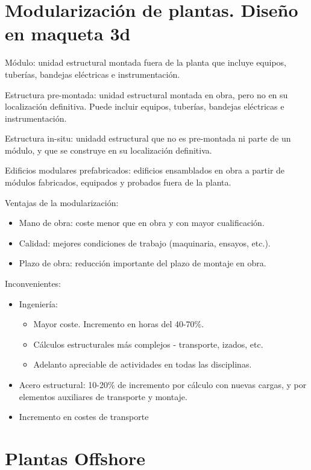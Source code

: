 \section{Modularización de plantas. Diseño en maqueta 3d}

Módulo: unidad estructural montada fuera de la planta que incluye equipos, tuberías, bandejas eléctricas e instrumentación.

Estructura pre-montada: unidad estructural montada en obra, pero no en su localización definitiva. Puede incluir equipos, tuberías, bandejas eléctricas e instrumentación.

Estructura in-situ: unidadd estructural que no es pre-montada ni parte de un módulo, y que se construye en su localización definitiva.

Edificios modulares prefabricados: edificios ensamblados en obra a partir de módulos fabricados, equipados y probados fuera de la planta.

Ventajas de la modularización:
\begin{itemize}
    \item Mano de obra: coste menor que en obra y con mayor cualificación.
    \item Calidad: mejores condiciones de trabajo (maquinaria, ensayos, etc.).
    \item Plazo de obra: reducción importante del plazo de montaje en obra.
\end{itemize}

Inconvenientes:
\begin{itemize}
    \item Ingeniería:
    \begin{itemize}
        \item Mayor coste. Incremento en horas del 40-70\%.
        \item Cálculos estructurales más complejos - transporte, izados, etc.
        \item Adelanto apreciable de actividades en todas las disciplinas.
    \end{itemize}
    \item Acero estructural: 10-20\% de incremento por cálculo con nuevas cargas, y por elementos auxiliares de transporte y montaje.
    \item Incremento en costes de transporte
\end{itemize}

\section{Plantas Offshore}

